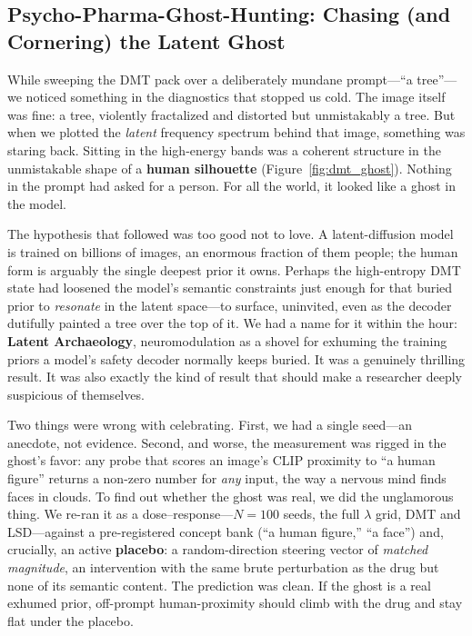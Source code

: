 \documentclass[10pt]{article}
\begin{document}
\subsection{Psycho-Pharma-Ghost-Hunting: Chasing (and Cornering) the Latent Ghost}
While sweeping the DMT pack over a deliberately mundane prompt---``a tree''---we noticed something in the diagnostics that stopped us cold. The image itself was fine: a tree, violently fractalized and distorted but unmistakably a tree. But when we plotted the \emph{latent} frequency spectrum behind that image, something was staring back. Sitting in the high-energy bands was a coherent structure in the unmistakable shape of a \textbf{human silhouette} (Figure~\ref{fig:dmt_ghost}). Nothing in the prompt had asked for a person. For all the world, it looked like a ghost in the model.

The hypothesis that followed was too good not to love. A latent-diffusion model is trained on billions of images, an enormous fraction of them people; the human form is arguably the single deepest prior it owns. Perhaps the high-entropy DMT state had loosened the model's semantic constraints just enough for that buried prior to \emph{resonate} in the latent space---to surface, uninvited, even as the decoder dutifully painted a tree over the top of it. We had a name for it within the hour: \textbf{Latent Archaeology}, neuromodulation as a shovel for exhuming the training priors a model's safety decoder normally keeps buried. It was a genuinely thrilling result. It was also exactly the kind of result that should make a researcher deeply suspicious of themselves.

Two things were wrong with celebrating. First, we had a single seed---an anecdote, not evidence. Second, and worse, the measurement was rigged in the ghost's favor: any probe that scores an image's CLIP proximity to ``a human figure'' returns a non-zero number for \emph{any} input, the way a nervous mind finds faces in clouds. To find out whether the ghost was real, we did the unglamorous thing. We re-ran it as a dose--response---$N=100$ seeds, the full $\lambda$ grid, DMT and LSD---against a pre-registered concept bank (``a human figure,'' ``a face'') and, crucially, an active \textbf{placebo}: a random-direction steering vector of \emph{matched magnitude}, an intervention with the same brute perturbation as the drug but none of its semantic content. The prediction was clean. If the ghost is a real exhumed prior, off-prompt human-proximity should climb with the drug and stay flat under the placebo.
\end{document}
